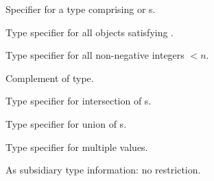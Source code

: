 \begin{LIST}{1cm}
  {
  Specifier for a type comprising  or s.
  }

  {
  Type specifier for all objects satisfying . 
  }

  {
  Type specifier for all non-negative integers $<n$.
  }

  {
  Complement of type.
  }

  {
  Type specifier for intersection of s.
  }

  {
  Type specifier for union of s.
  }

  {
  Type specifier for multiple values.
  }

  \IT{\kwd{\A}}
  {
    As subsidiary type information: no restriction.
  }
  \end{LIST}



